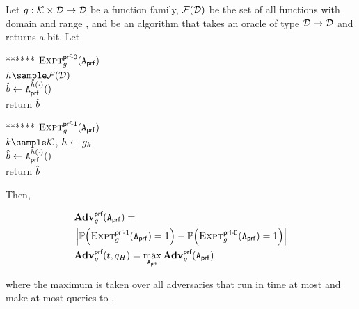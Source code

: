 \begin{definition}
	\label{dfn:prp}
	Let $\genericFnFamily: \genericFnKeyspace \times \genericFnDomain
	\rightarrow \genericFnDomain$ be a function family,
	$\allFuncs{\genericFnDomain}$ be the set of all functions with domain
	and range \genericFnDomain, and \prfAdversary be an algorithm that
	takes an oracle of type $\genericFnDomain \rightarrow
	\genericFnDomain$ and returns a bit.  Let
	
	\smallskip
	\begin{minipage}[t]{0.4\columnwidth}
		\begin{tabbing}
			***\=***\=\kill
			$\Experiment{\prfLabel[0]}{\genericFnFamily}(\prfAdversary)$ \\
			\> $\genericFn \sample \allFuncs{\genericFnDomain}$ \\
			\> $\prfGuess \leftarrow \prfAdversary^{\genericFn(\cdot)}()$ \\
			\> return $\prfGuess$
		\end{tabbing}
	\end{minipage}
	\hspace{50pt}
	\begin{minipage}[t]{0.4\columnwidth}
		\begin{tabbing}
			***\=***\=\kill
			$\Experiment{\prfLabel[1]}{\genericFnFamily}(\prfAdversary)$ \\
			\> $\genericFnKey \sample \genericFnKeyspace$, $\genericFn \gets 
			\genericFnFamily[\genericFnKey]$ \\
			\> $\prfGuess \leftarrow \prfAdversary^{\genericFn(\cdot)}()$ \\
			\> return $\prfGuess$
		\end{tabbing}
	\end{minipage}
	
	\smallskip
	\noindent Then,
	
	\begin{eqnarray*}
		& \Advantage{\prfLabel}{\genericFnFamily}(\prfAdversary) = \\
		& \left|\prob{\Experiment{\prfLabel[1]}{\genericFnFamily}(\prfAdversary) = 1} - 
		\prob{\Experiment{\prfLabel[0]}{\genericFnFamily}(\prfAdversary) = 1} \right| \\
		& \Advantage{\prfLabel}{\genericFnFamily}(\timeBound, \oracleQueries)
		= \max_{\prfAdversary} \Advantage{\prfLabel}{\genericFnFamily}(\prfAdversary)
	\end{eqnarray*}
	
	\noindent
	where the maximum is taken over all adversaries \prfAdversary that run in
	time at most \timeBound and make at most \forwardOracleQueries queries
	to \genericFn.
\end{definition}

